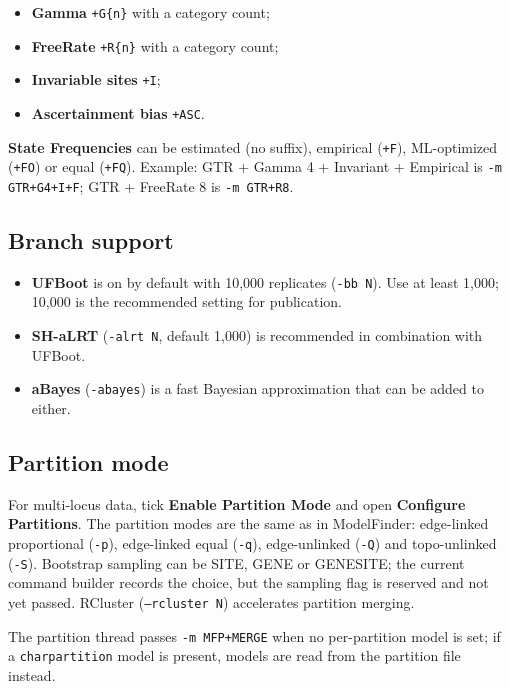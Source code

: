 \documentclass[10pt]{report}
\begin{document}
\begin{itemize}
  \item \textbf{Gamma} \texttt{+G\{n\}} with a category count;
  \item \textbf{FreeRate} \texttt{+R\{n\}} with a category count;
  \item \textbf{Invariable sites} \texttt{+I};
  \item \textbf{Ascertainment bias} \texttt{+ASC}.
\end{itemize}

\textbf{State Frequencies} can be estimated (no suffix), empirical
(\texttt{+F}), ML-optimized (\texttt{+FO}) or equal (\texttt{+FQ}). Example:
GTR + Gamma 4 + Invariant + Empirical is \texttt{-m GTR+G4+I+F}; GTR + FreeRate
8 is \texttt{-m GTR+R8}.

\subsection{Branch support}

\begin{itemize}
  \item \textbf{UFBoot} is on by default with 10{,}000 replicates
        (\texttt{-bb N}). Use at least 1{,}000; 10{,}000 is the recommended
        setting for publication.
  \item \textbf{SH-aLRT} (\texttt{-alrt N}, default 1{,}000) is recommended in
        combination with UFBoot.
  \item \textbf{aBayes} (\texttt{-abayes}) is a fast Bayesian approximation
        that can be added to either.
\end{itemize}

\subsection{Partition mode}

For multi-locus data, tick \textbf{Enable Partition Mode} and open
\textbf{Configure Partitions}. The partition modes are the same as in
ModelFinder: edge-linked proportional (\texttt{-p}), edge-linked equal
(\texttt{-q}), edge-unlinked (\texttt{-Q}) and topo-unlinked (\texttt{-S}).
Bootstrap sampling can be SITE, GENE or GENESITE; the current command builder
records the choice, but the sampling flag is reserved and not yet passed.
RCluster (\texttt{--rcluster N}) accelerates partition merging.

The partition thread passes \texttt{-m MFP+MERGE} when no per-partition model
is set; if a \texttt{charpartition} model is present, models are read from the
partition file instead.
\end{document}
